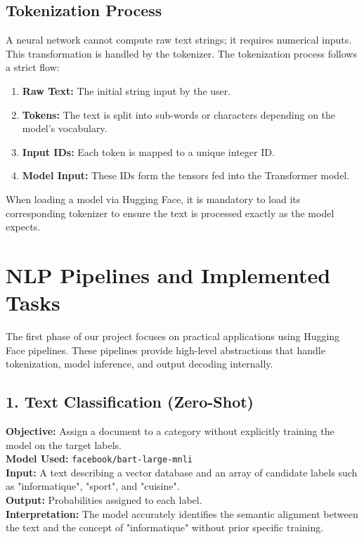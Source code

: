 \documentclass[11pt,a4paper]{article}
\begin{document}
\subsection{Tokenization Process}
A neural network cannot compute raw text strings; it requires numerical inputs. This transformation is handled by the tokenizer. The tokenization process follows a strict flow:
\begin{enumerate}
    \item \textbf{Raw Text:} The initial string input by the user.
    \item \textbf{Tokens:} The text is split into sub-words or characters depending on the model's vocabulary.
    \item \textbf{Input IDs:} Each token is mapped to a unique integer ID.
    \item \textbf{Model Input:} These IDs form the tensors fed into the Transformer model.
\end{enumerate}
When loading a model via Hugging Face, it is mandatory to load its corresponding tokenizer to ensure the text is processed exactly as the model expects.

\section{NLP Pipelines and Implemented Tasks}

The first phase of our project focuses on practical applications using Hugging Face pipelines. These pipelines provide high-level abstractions that handle tokenization, model inference, and output decoding internally.

\subsection{1. Text Classification (Zero-Shot)}
\textbf{Objective:} Assign a document to a category without explicitly training the model on the target labels. \\
\textbf{Model Used:} \texttt{facebook/bart-large-mnli} \\
\textbf{Input:} A text describing a vector database and an array of candidate labels such as "informatique", "sport", and "cuisine". \\
\textbf{Output:} Probabilities assigned to each label. \\
\textbf{Interpretation:} The model accurately identifies the semantic alignment between the text and the concept of "informatique" without prior specific training.
\end{document}
